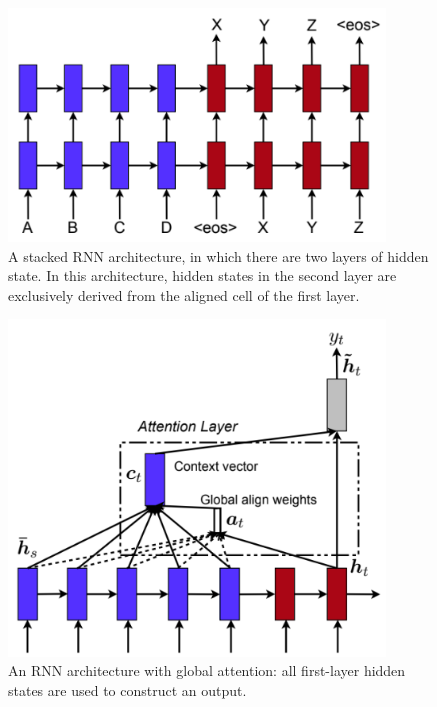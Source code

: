 \begin{figure}[ht]
\includegraphics[width=10cm]{images/stacked.png}
\centering
\caption{A stacked RNN architecture, in which there are two layers of hidden state. In this architecture, hidden states in the second layer are exclusively derived from the aligned cell of the first layer. \parencite{Luong2015}}
\end{figure}

\begin{figure}[p]
\includegraphics[width=10cm]{images/global.png}
\centering
\caption{An RNN architecture with global attention: all first-layer hidden states are used to construct an output. \parencite{Luong2015}}
\label{fig:global}
\end{figure}

